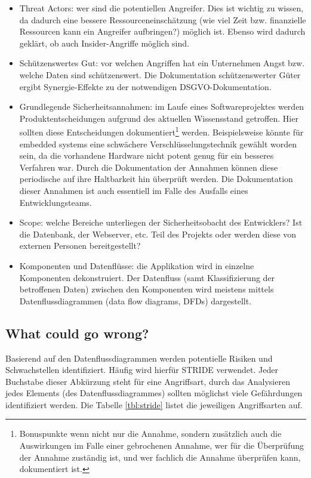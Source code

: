 \begin{itemize}
	\item Threat Actors: wer sind die potentiellen Angreifer. Dies ist wichtig zu wissen, da dadurch eine bessere Ressourceneinschätzung (wie viel Zeit bzw. finanzielle Ressourcen kann ein Angreifer aufbringen?) möglich ist. Ebenso wird dadurch geklärt, ob auch Insider-Angriffe möglich sind.
	\item Schützenswertes Gut: vor welchen Angriffen hat ein Unternehmen Angst bzw. welche Daten sind schützenswert. Die Dokumentation schützenswerter Güter ergibt Synergie-Effekte zu der notwendigen DSGVO-Dokumentation.
	\item Grundlegende Sicherheitsannahmen: im Laufe eines Softwareprojektes werden Produktentscheidungen aufgrund des aktuellen Wissensstand getroffen. Hier sollten diese Entscheidungen dokumentiert\footnote{Bonuspunkte wenn nicht nur die Annahme, sondern zusätzlich auch die Auswirkungen im Falle einer gebrochenen Annahme, wer für die Überprüfung der Annahme zuständig ist, und wer fachlich die Annahme überprüfen kann, dokumentiert ist.} werden. Beispielsweise könnte für embedded systems eine schwächere Verschlüsselungstechnik gewählt worden sein, da die vorhandene Hardware nicht potent genug für ein besseres Verfahren war. Durch die Dokumentation der Annahmen können diese periodische auf ihre Haltbarkeit hin überprüft werden. Die Dokumentation dieser Annahmen ist auch essentiell im Falle des Ausfalls eines Entwicklungsteams.
	\item Scope: welche Bereiche unterliegen der Sicherheitsobacht des Entwicklers? Ist die Datenbank, der Webserver, etc. Teil des Projekts oder werden diese von externen Personen bereitgestellt?
	\item Komponenten und Datenflüsse: die Applikation wird in einzelne Komponenten dekonstruiert. Der Datenfluss (samt Klassifizierung der betroffenen Daten) zwischen den Komponenten wird meistens mittels Datenflussdiagrammen (data flow diagrams, DFDs) dargestellt.
\end{itemize}

\subsection{What could go wrong?}

Basierend auf den Datenflussdiagrammen werden potentielle Risiken und Schwachstellen identifiziert. Häufig wird hierfür STRIDE verwendet. Jeder Buchstabe dieser Abkürzung steht für eine Angriffsart, durch das Analysieren jedes Elements (des Datenflussdiagrammes) sollten möglichst viele Gefährdungen identifiziert werden. Die Tabelle \ref{tbl:stride} listet die jeweiligen Angriffsarten auf.

